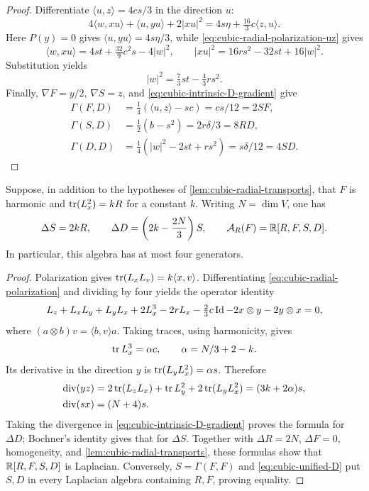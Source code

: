 \begin{proof}
Differentiate \(\langle u,z\rangle=4cs/3\) in the direction \(u\):
\[
 4\langle w,xu\rangle+\langle u,yu\rangle+2|xu|^2
 =4s\eta+\tfrac{16}{3}c\langle z,u\rangle.
\]
Here \(P(y)=0\) gives \(\langle u,yu\rangle=4s\eta/3\), while
\eqref{eq:cubic-radial-polarization-uz} gives
\[
 \langle w,xu\rangle=4st+\tfrac{32}{9}c^2s-4|w|^2,
 \qquad |xu|^2=16rs^2-32st+16|w|^2.
\]
Substitution yields
\begin{equation}\label{eq:cubic-radial-polarization-w}
 |w|^2=\tfrac73st-\tfrac43rs^2.
\end{equation}
Finally, \(\nabla F=y/2\), \(\nabla S=z\), and
\eqref{eq:cubic-intrinsic-D-gradient} give
\[
 \begin{aligned}
 \Gamma(F,D)&=\tfrac14(\langle u,z\rangle-sc)=cs/12=2SF,\\
 \Gamma(S,D)&=\tfrac12(b-s^2)=2r\delta/3=8RD,\\
 \Gamma(D,D)&=\tfrac14(|w|^2-2st+rs^2)=s\delta/12=4SD.
 \end{aligned}
\]
\end{proof}

\begin{proposition}
\label{prop:cubic-scalar-killing-closure}
Suppose, in addition to the hypotheses of
\cref{lem:cubic-radial-transports}, that \(F\) is harmonic and
\(\operatorname{tr}(L_x^2)=kR\) for a constant \(k\). Writing \(N=\dim V\), one has
\begin{equation}\label{eq:cubic-scalar-killing-laplacians}
 \Delta S=2kR,\qquad
 \Delta D=\left(2k-\frac{2N}{3}\right)S,
 \qquad \mathcal A_R(F)=\mathbb R[R,F,S,D].
\end{equation}
In particular, this algebra has at most four generators.
\end{proposition}

\begin{proof}
Polarization gives \(\operatorname{tr}(L_xL_v)=k\langle x,v\rangle\).
Differentiating \eqref{eq:cubic-radial-polarization} and dividing
by four yields the operator identity
\[
 L_z+L_xL_y+L_yL_x+2L_x^3-2rL_x
 -\tfrac23c\operatorname{Id}-2x\otimes y-2y\otimes x=0,
\]
where \((a\otimes b)v=\langle b,v\rangle a\).
Taking traces, using harmonicity, gives
\[
 \operatorname{tr} L_x^3=\alpha c,\qquad \alpha=N/3+2-k.
\]
Its derivative in the direction \(y\) is
\(\operatorname{tr}(L_yL_x^2)=\alpha s\). Therefore
\[
 \begin{aligned}
 \operatorname{div}(yz)
 &=2\operatorname{tr}(L_zL_x)+\operatorname{tr} L_y^2+2\operatorname{tr}(L_yL_x^2)
   =(3k+2\alpha)s,\\
 \operatorname{div}(sx)&=(N+4)s.
 \end{aligned}
\]
Taking the divergence in \eqref{eq:cubic-intrinsic-D-gradient}
proves the formula for \(\Delta D\); Bochner's identity gives that
for \(\Delta S\). Together with \(\Delta R=2N\), \(\Delta F=0\),
homogeneity, and \cref{lem:cubic-radial-transports}, these formulas
show that \(\mathbb R[R,F,S,D]\) is Laplacian. Conversely,
\(S=\Gamma(F,F)\) and \eqref{eq:cubic-unified-D} put \(S,D\) in
every Laplacian algebra containing \(R,F\), proving equality.
\end{proof}

